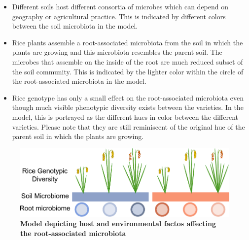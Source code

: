 \begin{itemize}
\item Different soils host different consortia of microbes which can depend on geography or agricultural practice. This is indicated by different colors between the soil microbiota in the model.
\item Rice plants assemble a root-associated microbiota from the soil in which the plants are growing and this microbiota resembles the parent soil. The microbes that assemble on the inside of the root are much reduced subset of the soil community. This is indicated by the lighter color within the circle of the root-associated microbiota in the model.
\item Rice genotype has only a small effect on the root-associated microbiota even though much visible phenotypic diversity exists between the varieties. In the model, this is portrayed as the different hues in color between the different varieties. Please note that they are still reminiscent of the original hue of the parent soil in which the plants are growing.
\end{itemize}

\begin{figure}[h]
\centering
\includegraphics[width=5in]{Figures/figurec_1}
\caption[Figure 5.1]{\textbf{Model depicting host and environmental factos affecting the root-associated microbiota}}
\label{Figure 5.1}
\end{figure}

